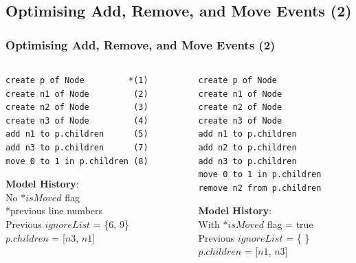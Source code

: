 \documentclass{beamer}
\begin{document}
\begin{frame}[fragile]
\section{Optimising Add, Remove, and Move Events (2)}
\frametitle{Optimising Add, Remove, and Move Events (2)}

\begin{columns}
\begin{column}[t]{0.52\linewidth}
\begin{lstlisting}[style=eol,caption={A replay of the CBP in Listing 6 after naive optimisation (without $*isMoved$ flag).},label=lst:naive_add_remove_move_reference]
create p of Node         *(1) 
create n1 of Node         (2)
create n2 of Node         (3)
create n3 of Node         (4)
add n1 to p.children      (5)
add n3 to p.children      (7) 
move 0 to 1 in p.children (8)
\end{lstlisting}

\begin{footnotesize}
\textbf{Model History}:\\
No $*isMoved$ flag\\
*previous line numbers\\
Previous $ignoreList$ = \{6, 9\}\\
$p$.$children$ = [$n3$, $n1$]
\end{footnotesize}

\end{column}
\begin{column}[t]{0.48\linewidth}
\begin{lstlisting}[style=eol,caption={A replay of the CBP in Listing 6 after optimisation with $*isMoved$ flag.},label=lst:add_remove_move_reference_with_flag]
create p of Node         
create n1 of Node        
create n2 of Node        
create n3 of Node        
add n1 to p.children     
add n2 to p.children     
add n3 to p.children     
move 0 to 1 in p.children
remove n2 from p.children
\end{lstlisting}

\begin{footnotesize}
\textbf{Model History}:\\
With $*isMoved$ flag = true\\
Previous $ignoreList$ = \{ \}\\
$p$.$children$ = [$n1$, $n3$]
\end{footnotesize}

\end{column}
\end{columns}

\end{frame}
\end{document}
